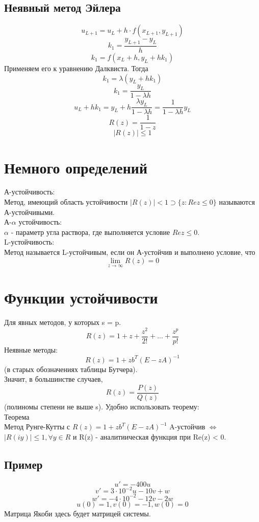\documentclass[a4paper,12pt]{article}
\newcommand\attention[1]{\colorbox{cyan!30}{#1}}
\begin{document}
\subsection*{Неявный метод Эйлера}
\[u_{L+1} = u_L + h \cdot f(x_{L+1}, y_{L+1})\]
\[k_1 = \frac{y_{L+1} - y_L}{h}\]
\[k_1 = f(x_L + h, y_L + h k_1)\]
Применяем его к уравнению Далквиста. Тогда
\[k_1 = \lambda (y_L + hk_1)\]
\[k_1 = \frac{y_L}{1 - \lambda h}\]
\[u_L + h k_1 = y_L + h \frac{\lambda y_L}{1 - \lambda h} = \frac{1}{1 - \lambda h} y_L\]
\[R(z) = \frac{1}{1 - z}\]
\[|R(z)| \leq 1\]

\section*{Немного определений}
\attention{А-устойчивость}:\\
Метод, имеющий область устойчивости $|R(z)| < 1 \supset \{z: Rez \leq 0\}$ называются А-устойчивыми.\\

\attention{А-$\alpha$ устойчивость}:\\
$\alpha$ - параметр угла раствора, где выполняется условие $Re z \leq 0$.\\

\attention{L-устойчивость}:\\
Метод называется L-устойчивым, если он А-устойчив и выполнено условие, что
\[\lim_{z \xrightarrow{} \infty} R(z) = 0\]

\section*{Функции устойчивости}
Для явных методов, у которых s = p.
\[R(z) = 1 + z + \frac{z^2}{2!} + ... + \frac{z^p}{p!}\]
Неявные методы:
\[R(z) = 1 + z b^T (E-zA)^{-1}\]
(в старых обозначениях таблицы Бутчера).\\

Значит, в большинстве случаев,\\
\[R(z) = \frac{P(z)}{Q(z)}\]
(полиномы степени не выше s). Удобно использовать теорему:\\
\attention{Теорема}\\
Метод Рунге-Кутты с $R(z) = 1 + z b^T (E-zA)^{-1}$ A-устойчив $\Leftrightarrow$
$|R(iy)| \leq 1, \forall y \in R$ и R(z) - аналитиическая функция при Re(z) < 0.

\subsection*{Пример}
\[u' = -400 u\]
\[v' = 3 \cdot 10^{-2} u - 10v + w\]
\[w' = -4\cdot 10^{-2} -12v - 2w\] 
\[u(0) = 1, v(0) = -1, w(0) = 0\]
Матрица Якоби здесь будет матрицей системы. \\
\end{document}
